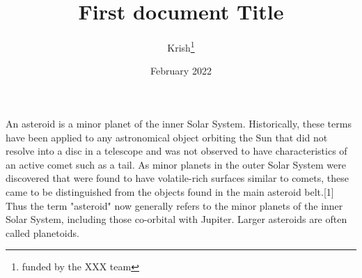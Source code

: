 \documentclass[10pt,a4paper,twoside,twocolumn, english]{report}
\title{First document Title}
\author{Krish\thanks{funded by the XXX team}}
\date{February 2022}
\begin{document}
\maketitle

An asteroid is a minor planet of the inner Solar System. Historically, these terms have been applied to any astronomical object orbiting the Sun that did not resolve into a disc in a telescope and was not observed to have characteristics of an active comet such as a tail. As minor planets in the outer Solar System were discovered that were found to have volatile-rich surfaces similar to comets, these came to be distinguished from the objects found in the main asteroid belt.[1] Thus the term "asteroid" now generally refers to the minor planets of the inner Solar System, including those co-orbital with Jupiter. Larger asteroids are often called planetoids.

\end{document}
